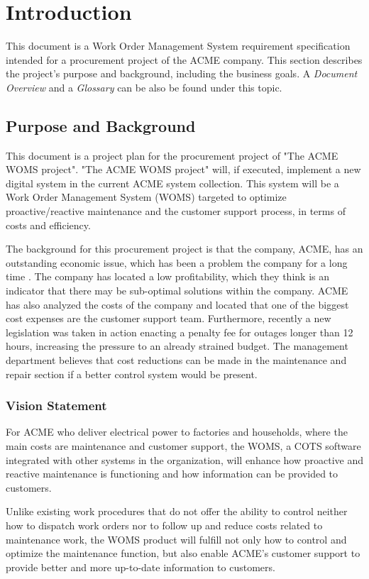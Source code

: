 \section{Introduction}
\label{sec:introduction}
This document is a Work Order Management System requirement specification intended for a procurement project of the ACME company. This section describes the project's purpose and background, including the business goals. A \emph{Document Overview} and a \emph{Glossary} can be also be found under this topic.
\subsection{Purpose and Background}
\label{purpose_and_background}
This document is a project plan for the procurement project of "The ACME WOMS project". "The ACME WOMS project" will, if executed, implement a new digital system in the current ACME system collection. This system will be a Work Order Management System (WOMS) targeted to optimize proactive/reactive maintenance and the customer support process, in terms of costs and efficiency.

The background for this procurement project is that the company, ACME, has an outstanding economic issue, which has been a problem the company for a long time \cite{A}. The company has located a low profitability, which they think is an indicator that there may be sub-optimal solutions within the company. ACME has also analyzed the costs of the company and located that one of the biggest cost expenses are the customer support team. Furthermore, recently a new legislation was taken in action enacting a penalty fee for outages longer than 12 hours, increasing the pressure to an already strained budget. The management department believes that cost reductions can be made in the maintenance and repair section if a better control system would be present.

\subsubsection{Vision Statement}
\label{vision_statement}
For ACME who deliver electrical power to factories and households, where the main costs are maintenance and customer support, the WOMS, a COTS software integrated with other systems in the organization, will enhance how proactive and reactive maintenance is functioning and how information can be provided to customers.

Unlike existing work procedures that do not offer the ability to control neither how to dispatch work orders nor to follow up and reduce costs related to maintenance work, the WOMS product will fulfill not only how to control and optimize the maintenance function, but also enable ACME's customer support to provide better and more up-to-date information to customers. 

